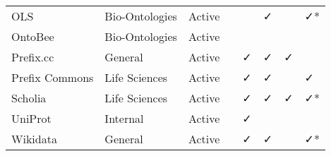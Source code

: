 \begin{table}
\begin{tabular}{llllllll}
            OLS &  Bio-Ontologies &       Active &                           &                        &                              ✓ &                             &                     ✓* \\
        OntoBee &  Bio-Ontologies &       Active &                           &                        &                                &                             &                        \\
      Prefix.cc &         General &       Active &                           &                      ✓ &                              ✓ &                           ✓ &                        \\
 Prefix Commons &   Life Sciences &       Active &                           &                      ✓ &                              ✓ &                             &                      ✓ \\
        Scholia &   Life Sciences &       Active &                           &                      ✓ &                              ✓ &                           ✓ &                     ✓* \\
        UniProt &        Internal &       Active &                           &                      ✓ &                                &                             &                        \\
       Wikidata &         General &       Active &                           &                      ✓ &                              ✓ &                             &                     ✓* \\
\bottomrule
\end{tabular}
\end{table}
